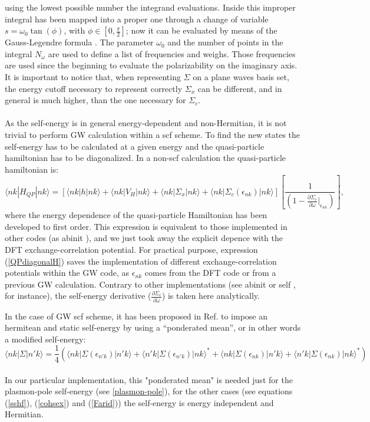 \documentclass[11pt]{article}
\begin{document}
using the lowest possible number the
integrand evaluations.
Inside \SAX this improper integral has been mapped into a proper one through
a change of variable $s=\omega_0 \tan (\phi)$, with
$\phi \in [0,\frac{\pi}{2}]$; now it can be evaluated
by means of the
Gauss-Legendre formula \cite{Nr}.
The parameter $\omega_0$ and the number of points in the integral
$N_\omega$ are used to define a list of frequencies and weighs.
Those frequencies are used since the beginning to evaluate
the polarizability on the imaginary axis.
\\
It is important to notice that, when representing $\Sigma$
on a plane waves basis set, the energy cutoff necessary to represent
correctly $\Sigma_x$ can be different, and in general is much higher,
than the one necessary for $\Sigma_c$.
\\
\\
As the self-energy is in general energy-dependent and non-Hermitian, it is not trivial to perform
GW calculation within a scf scheme. To find the new states the self-energy has to be calculated at a given energy and the 
quasi-particle hamiltonian has to be diagonalized. 
In a non-scf calculation the quasi-particle hamiltonian is:
\begin{equation}\label{QPdiagonalH}
\langle nk | H_{QP}| nk \rangle = [\langle nk | h| nk \rangle + \langle nk | V_H | nk \rangle + 
\langle nk | \Sigma_x | nk \rangle + \langle nk | \Sigma_c(\epsilon_{nk}) | nk \rangle]
[\frac{1}{(1-\frac{\partial\Sigma_c}{\partial\omega}|_{\epsilon_{nk}})}],
\end{equation}
where the energy dependence of the quasi-particle Hamiltonian has been developed to first order. 
This expression is equivalent to those implemented in other codes (as abinit \cite{ABINIT}), and we just took away the explicit
depence with the DFT exchange-correlation potential. For practical purpose, expression (\ref{QPdiagonalH}) saves the implementation of different exchange-correlation potentials within the GW code, as $\epsilon_{nk}$ comes from 
the DFT code or from a previous GW calculation. Contrary to other implementations (see abinit \cite{ABINIT} or self \cite{SELF}, for instance), the self-energy derivative 
($\frac{\partial\Sigma_c}{\partial\omega}$) is taken here analytically.

In the case of GW scf scheme, it has been proposed in Ref.\cite{fale04prl} to impose an hermitean and static
self-energy by using a ``ponderated mean'', or in other words a modified self-energy:
\begin{equation}
\langle nk|\Sigma | n'k \rangle = \frac{1}{4}(\langle nk|\Sigma(\epsilon_{n'k})|n'k\rangle + \langle n'k|\Sigma(\epsilon_{n'k})|nk\rangle^* + \langle nk|\Sigma(\epsilon_{nk})|n'k\rangle + \langle n'k|\Sigma(\epsilon_{nk})|nk\rangle^*)
\end{equation} 
\\
In our particular implementation, this "ponderated mean" is needed just for the plasmon-pole self-energy (see \ref{plasmon-pole}), for the other
cases (see equations (\ref{sshf}), (\ref{cohsex}) and (\ref{Farid})) the self-energy is energy independent and Hermitian.
\end{document}
